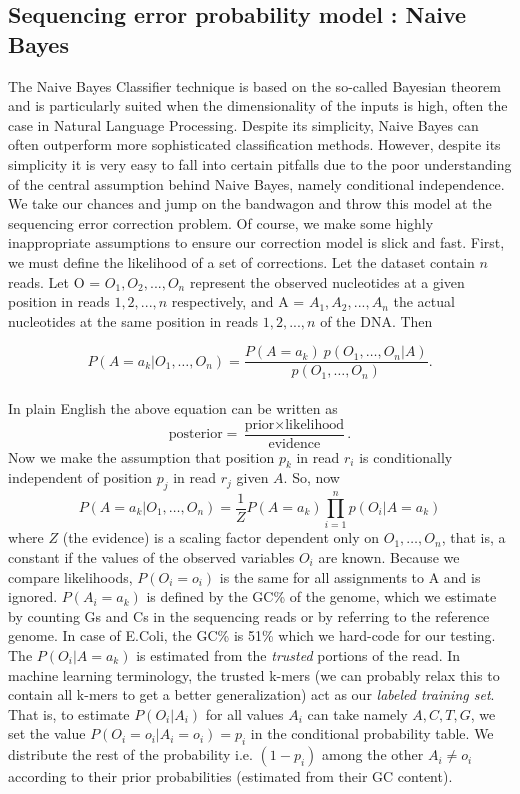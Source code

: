 \documentclass[11pt]{article}
\begin{document}
\subsection{Sequencing error probability model : Naive Bayes}
The Naive Bayes Classifier technique is based on the so-called Bayesian theorem and is particularly suited when the dimensionality of the inputs is high, often the case in Natural Language Processing. Despite its simplicity, Naive Bayes can often outperform more sophisticated classification methods. However, despite its simplicity it is very easy to fall into certain pitfalls due to the poor understanding of the central assumption behind Naive Bayes, namely conditional independence. We take our chances and jump on the bandwagon and throw this model at the sequencing error correction problem. Of course, we make some highly inappropriate assumptions to ensure our correction model is slick and fast. First, we must define the likelihood of a set of corrections. Let the dataset contain $n$ reads.  Let O = $O_1, O_2,..., O_n$ represent the observed nucleotides at a given position in reads $1, 2,..., n$ respectively, and A = $A_1, A_2,..., A_n$ the actual nucleotides at the same position in reads $1, 2,..., n$ of the DNA. Then 

\begin{displaymath} P(A = a_k \vert O_1,\dots,O_n) = \frac{P(A=a_k) \ p(O_1,\dots,O_n\vert A)}{p(O_1,\dots,O_n)}. \end{displaymath}\\
In plain English the above equation can be written as
\begin{displaymath}
  \mbox{posterior} = \frac{\mbox{prior} \times \mbox{likelihood}}{\mbox{evidence}}.
\end{displaymath}
Now we make the assumption that position $p_k$ in read $r_i$ is conditionally independent of position $p_j$ in read $r_j$ given $A$. So, now
\begin{displaymath} P(A = a_k\vert O_1,\dots,O_n) = \frac{1}{Z}  P(A = a_k) \prod_{i=1}^n p(O_i \vert A = a_k) \end{displaymath}
where $Z$ (the evidence) is a scaling factor dependent only on $O_1,\dots,O_n$, that is, a constant if the values of the observed variables $O_i$ are known. Because we compare likelihoods, $P(O_i = o_i)$ is the same for all assignments to A and is ignored. $P(A_i = a_k)$ is defined by the GC\% of the genome, which we estimate by counting Gs and Cs in the sequencing reads or by referring to the reference genome. In case of E.Coli, the GC\% is 51\% which we hard-code for our testing. The $P(O_i \vert A = a_k)$ is estimated from the \textit{trusted} portions of the read. In machine learning terminology, the trusted k-mers (we can probably relax this to contain all k-mers to get a better generalization) act as our \emph{labeled training set}. That is, to estimate $P(O_i \vert A_i)$ for all values $A_i$ can take namely ${A,C,T,G}$, we set the value $P(O_i = o_i \vert A_i = o_i) = p_i$ in the conditional probability table. We distribute the rest of the probability i.e. $(1-p_i)$ among the other $A_i \neq o_i$ according to their prior probabilities (estimated from their GC content).  
\end{document}

